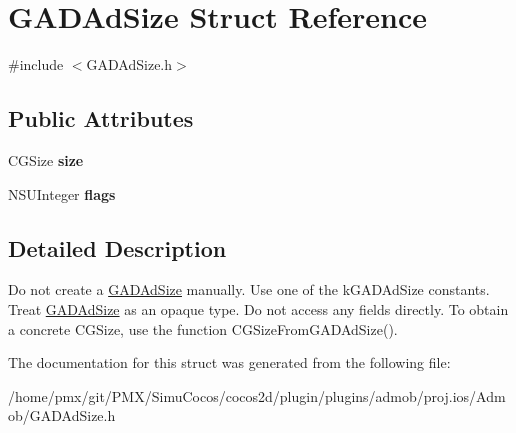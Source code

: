 \hypertarget{structGADAdSize}{}\section{G\+A\+D\+Ad\+Size Struct Reference}
\label{structGADAdSize}


{\ttfamily \#include $<$G\+A\+D\+Ad\+Size.\+h$>$}

\subsection*{Public Attributes}
\begin{DoxyCompactItemize}
\item 
\mbox{\label{structGADAdSize_a57055eade1734cb68c77ec9f3e8b0911}} 
C\+G\+Size {\bfseries size}
\item 
\mbox{\label{structGADAdSize_ad18d2f0cdfcd8c596e2df6173adceebd}} 
N\+S\+U\+Integer {\bfseries flags}
\end{DoxyCompactItemize}


\subsection{Detailed Description}
Do not create a \hyperlink{structGADAdSize}{G\+A\+D\+Ad\+Size} manually. Use one of the k\+G\+A\+D\+Ad\+Size constants. Treat \hyperlink{structGADAdSize}{G\+A\+D\+Ad\+Size} as an opaque type. Do not access any fields directly. To obtain a concrete C\+G\+Size, use the function C\+G\+Size\+From\+G\+A\+D\+Ad\+Size(). 

The documentation for this struct was generated from the following file\+:\begin{DoxyCompactItemize}
\item 
/home/pmx/git/\+P\+M\+X/\+Simu\+Cocos/cocos2d/plugin/plugins/admob/proj.\+ios/\+Admob/G\+A\+D\+Ad\+Size.\+h\end{DoxyCompactItemize}
